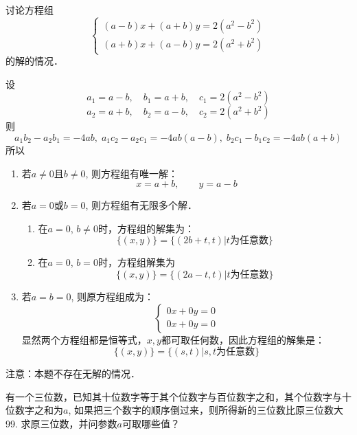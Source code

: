 \begin{example}
讨论方程组
\[\begin{cases}
    (a-b) x+ (a+b) y=2 (a^2-b^2)\\
    (a+b) x+ (a-b)y=2 (a^2+b^2)
\end{cases}\]
的解的情况．    
\end{example}

\begin{solution}
设$$a_1=a-b,\quad b_1 =a+b,\quad c_1=2 (a^2-b^2)$$
$$a_2=a+b,\quad b_2 =a-b,\quad c_2=2 (a^2+b^2)$$
则$$a_1b_2-a_2b_1=-4ab,\; a_1c_2-a_2c_1=-4ab(a-b),\; b_2c_1-b_1c_2=-4ab(a+b)$$所以
\begin{enumerate}
\item 若$a\ne 0$且$b\ne 0$, 则方程组有唯一解：
\[x=a+b,\qquad y=a-b\]
\item 若$a=0$或$b=0$, 则方程组有无限多个解．
\begin{enumerate}
    \item 在$a=0$, $b\ne 0$时，方程组的解集为：
\[\{(x,y)\}=\{(2b+t,t)|\text{$t$为任意数}\}\]
\item 在$a=0$, $b=0$时，方程组解集为
\[\{(x,y)\}=\{(2a-t,t)|\text{$t$为任意数}\}\]
\end{enumerate}

\item 若$a=b=0$, 则原方程组成为：
\[\begin{cases}
    0x+0y=0 \\ 0x+0y=0 
\end{cases}\]
显然两个方程组都是恒等式，$x,y$都可取任何数，因此方程组的解集是：
\[\{(x,y)\} =\{ (s,t)|\text{$s,t$为任意数}\}\]
\end{enumerate}
注意：本题不存在无解的情况．
\end{solution}

\begin{example}
有一个三位数，已知其十位数字等于其个位数字与百位数字之和，其个位数字与十位数字之和为$a$, 如果把三个数字的顺序倒过来，则所得新的三位数比原三位数大99. 求原三位数，并问参数$a$可取哪些值？
\end{example}


